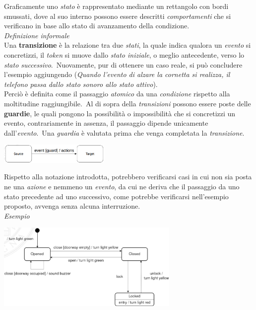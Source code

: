 \documentclass{article}
\begin{document}
Graficamente uno \textit{stato} è rappresentato mediante un rettangolo con bordi smussati, dove al suo interno possono essere descritti \textit{comportamenti} che si verificano in base allo stato di avanzamento della condizione.\vspace*{14pt}\\
\textit{Definizione informale}\\Una \textbf{transizione} è la relazione tra due \textit{stati}, la quale indica qualora un \textit{evento} si concretizzi, il \textit{token} si muove dallo \textit{stato iniziale}, o meglio antecedente, verso lo \textit{stato successivo}.\ Nuovamente, pur di ottenere un caso reale, si può concludere l'esempio aggiungendo (\textit{Quando l'evento di alzare la cornetta si realizza, il telefono passa dallo stato sonoro allo stato attivo}).\vspace*{14pt}\\
Perciò è definita come il passaggio \textit{atomico} da una \textit{condizione} rispetto alla moltitudine raggiungibile.\ Al di sopra della \textit{transizioni} possono essere poste delle \textbf{guardie}, le quali pongono la possibilità o impossibilità che si concretizzi un evento, contrariamente in assenza, il passaggio dipende unicamente dall'\textit{evento}.\ Una \textit{guardia} è valutata prima che venga completata la \textit{transizione}.\vspace*{7pt}
\begin{center}
    \includegraphics*[width=0.4\textwidth]{foto 1.png}
\end{center}
Rispetto alla notazione introdotta, potrebbero verificarsi casi in cui non sia posta ne una \textit{azione} e nemmeno un \textit{evento}, da cui ne deriva che il passaggio da uno stato precedente ad uno successivo, come potrebbe verificarsi nell'esempio proposto, avvenga senza alcuna interruzione.\vspace*{14pt}\\
\textit{Esempio}
\begin{center}
    \includegraphics[width=0.66\textwidth]{foto 2.png}
\end{center}
\end{document}

